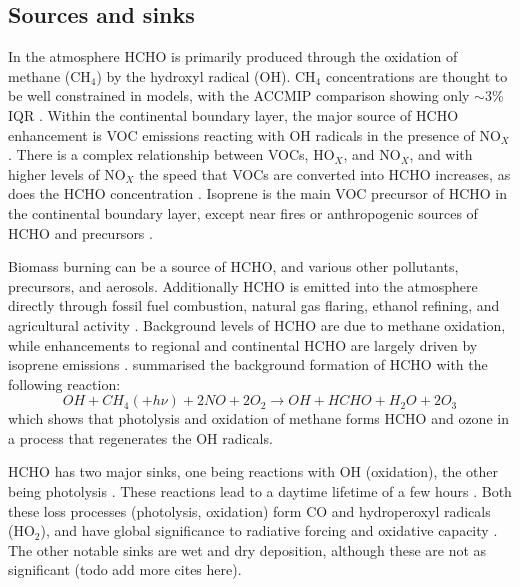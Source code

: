   \subsection{Sources and sinks}
    In the atmosphere HCHO is primarily produced through the oxidation of methane (CH$_4$) by the hydroxyl radical (OH).
    CH$_4$ concentrations are thought to be well constrained in models, with the ACCMIP comparison showing only $\sim3$\% IQR \citep{Young2013}.
    Within the continental boundary layer, the major source of HCHO enhancement is VOC emissions reacting with OH radicals in the presence of NO$_X$ \citep{Wagner2002, Millet2006, Kefauver2014}.
    There is a complex relationship between VOCs, HO$_X$, and NO$_X$, and with higher levels of NO$_X$ the speed that VOCs are converted into HCHO increases, as does the HCHO concentration \citep{Wolfe2016}.
    Isoprene is the main VOC precursor of HCHO in the continental boundary layer, except near fires or anthropogenic sources of HCHO and precursors \citep{Guenther1995, Kefauver2014, Wolfe2016}.
    
    Biomass burning can be a source of HCHO, and various other pollutants, precursors, and aerosols.
    Additionally HCHO is emitted into the atmosphere directly through fossil fuel combustion, natural gas flaring, ethanol refining, and agricultural activity \citep{Wolfe2016}.
    Background levels of HCHO are due to methane oxidation, while enhancements to regional and continental HCHO are largely driven by isoprene emissions \citep{Guenther1995, Palmer2003, Shim2005, Kefauver2014}.
    \citet{Atkinson2000} summarised the background formation of HCHO with the following reaction:
    \begin{equation} \label{ch_LitRev:eqn:MethaneBackground}
      OH + CH_4 (+ h\nu) + 2NO + 2O_2 \rightarrow OH + HCHO + H_2O + 2O_3
    \end{equation}
    which shows that photolysis and oxidation of methane forms HCHO and ozone in a process that regenerates the OH radicals.
    
    HCHO has two major sinks, one being reactions with OH (oxidation), the other being photolysis \citep{Crutzen1999, Wagner2002, Levy1972, Kefauver2014}.
    These reactions lead to a daytime lifetime of a few hours \citep{Atkinson2000, Millet2006}.
    Both these loss processes (photolysis, oxidation) form CO and hydroperoxyl radicals (HO$_2$), and have global significance to radiative forcing and oxidative capacity \citep{Franco2015}.
    The other notable sinks are wet and dry deposition, although these are not as significant \citep{Atkinson2000} (todo add more cites here).
    
